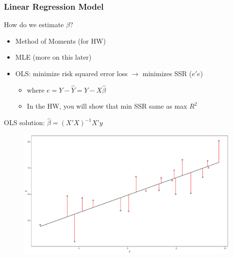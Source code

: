 \documentclass[
  shownotes,
  xcolor={svgnames},
  hyperref={colorlinks,citecolor=DarkBlue,linkcolor=DarkRed,urlcolor=DarkBlue}
  , aspectratio=169]{beamer}
\begin{document}
\begin{frame}
\frametitle{Linear Regression Model}

How do we estimate $\beta$?

\begin{itemize}
  \footnotesize
  \item Method of Moments {\tiny (for HW)}
  \item MLE {\tiny (more on this later)}
  \item OLS: minimize risk squared error loss $\rightarrow$ minimizes SSR ($e'e$) 
  \begin{itemize}
    \tiny
  \item where $e=Y-\hat Y=Y-X\hat\beta$
  \item In the HW, you will show that min SSR same as max $R^2$
  \end{itemize}  
\end{itemize}
\bigskip

OLS solution: $\hat \beta = (X'X)^{-1} X'y$

\bigskip
\begin{figure}[H] \centering
  \centering
  \includegraphics[scale=0.22]{figures/fig_1b.pdf}
  \\
  \tiny
\end{figure}


\end{frame}
\end{document}
